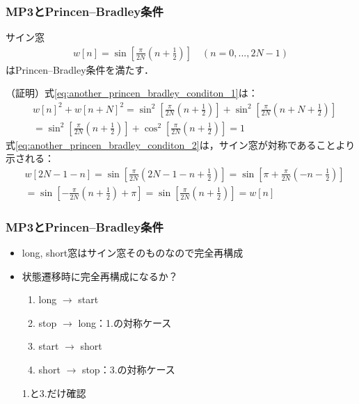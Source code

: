 \documentclass[14pt,xcolor=dvipsnames,table,dvipdfmx]{beamer}
\begin{document}
\begin{frame}[c]
    \frametitle{MP3とPrincen--Bradley条件}
    \begin{block}{}
        サイン窓
        \begin{align}
            w[n] = \sin \left[ \frac{\pi}{2N} \left( n + \frac{1}{2} \right) \right] \quad (n = 0, ..., 2N - 1)
        \end{align}
        はPrincen--Bradley条件を満たす．
    \end{block}
    \scriptsize
    （証明）式\eqref{eq:another_princen_bradley_conditon_1}は：
    \begin{align*}
        &w[n]^{2} + w[n + N]^{2} = \sin^{2} \left[ \frac{\pi}{2N} \left( n + \frac{1}{2} \right) \right] + \sin^{2} \left[ \frac{\pi}{2N} \left( n + N + \frac{1}{2} \right) \right] \\
        &= \sin^{2} \left[ \frac{\pi}{2N} \left( n + \frac{1}{2} \right) \right] + \cos^{2} \left[ \frac{\pi}{2N} \left( n + \frac{1}{2} \right) \right] = 1
    \end{align*}
    式\eqref{eq:another_princen_bradley_conditon_2}は，サイン窓が対称であることより示される：
    \begin{align*}
        & w[2N - 1 - n] = \sin\left[ \frac{\pi}{2N} \left( 2N - 1 - n + \frac{1}{2} \right) \right] = \sin\left[ \pi + \frac{\pi}{2N} \left( - n - \frac{1}{2} \right) \right] \\
        &= \sin \left[ -\frac{\pi}{2N} \left( n + \frac{1}{2} \right) + \pi \right] = \sin \left[ \frac{\pi}{2N} \left( n + \frac{1}{2} \right) \right] = w[n]
    \end{align*}
\end{frame}

\begin{frame}[c]
    \frametitle{MP3とPrincen--Bradley条件}
    \begin{itemize}
        \item long, short窓はサイン窓そのものなので完全再構成
        \item 状態遷移時に完全再構成になるか？
            \begin{enumerate}
                \item long $\rightarrow$ start
                \item stop $\rightarrow$ long：1.の対称ケース
                \item start $\rightarrow$ short
                \item short $\rightarrow$ stop：3.の対称ケース
            \end{enumerate}
            1.と3.だけ確認
    \end{itemize}
\end{frame}
\end{document}
